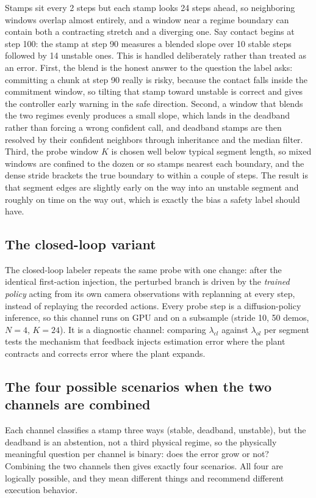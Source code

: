 \documentclass[11pt]{article}
\begin{document}
Stamps sit every 2 steps but each stamp looks 24 steps ahead, so neighboring windows
overlap almost entirely, and a window near a regime boundary can contain both a
contracting stretch and a diverging one. Say contact begins at step 100: the stamp
at step 90 measures a blended slope over 10 stable steps followed by 14 unstable
ones. This is handled deliberately rather than treated as an error. First, the blend
is the honest answer to the question the label asks: committing a chunk at step 90
really is risky, because the contact falls inside the commitment window, so tilting
that stamp toward unstable is correct and gives the controller early warning in the
safe direction. Second, a window that blends the two regimes evenly produces a small
slope, which lands in the deadband rather than forcing a wrong confident call, and
deadband stamps are then resolved by their confident neighbors through inheritance
and the median filter. Third, the probe window $K$ is chosen well below typical
segment length, so mixed windows are confined to the dozen or so stamps nearest each
boundary, and the dense stride brackets the true boundary to within a couple of
steps. The result is that segment edges are slightly early on the way into an
unstable segment and roughly on time on the way out, which is exactly the bias a
safety label should have.

\subsection{The closed-loop variant}

The closed-loop labeler repeats the same probe with one change: after the identical
first-action injection, the perturbed branch is driven by the \emph{trained policy}
acting from its own camera observations with replanning at every step, instead of
replaying the recorded actions. Every probe step is a diffusion-policy inference, so
this channel runs on GPU and on a subsample (stride 10, 50 demos, $N=4$, $K=24$). It
is a diagnostic channel: comparing $\lambda_{cl}$ against $\lambda_{ol}$ per segment
tests the mechanism that feedback injects estimation error where the plant contracts
and corrects error where the plant expands.

\subsection{The four possible scenarios when the two channels are combined}
\label{sec:scenarios}

Each channel classifies a stamp three ways (stable, deadband, unstable), but the
deadband is an abstention, not a third physical regime, so the physically meaningful
question per channel is binary: does the error grow or not? Combining the two
channels then gives exactly four scenarios. All four are logically possible, and
they mean different things and recommend different execution behavior.
\end{document}
